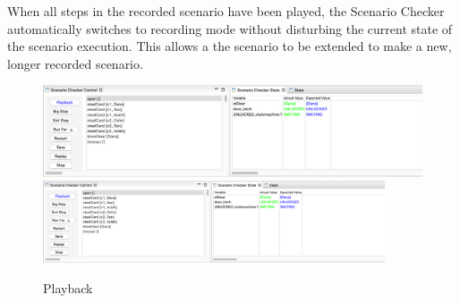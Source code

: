 When all steps in the recorded scenario have been played, the Scenario Checker automatically switches to recording mode without disturbing the current state of the scenario execution. This allows a the scenario to be extended to make a new, longer recorded scenario.

\begin{figure}[!htbp]
	\centering
	\ifplastex
	\includegraphics[width=512]{figures/playback}
	\else
	\includegraphics[width=0.9\textwidth]{figures/playback}
	\fi
	\caption{Playback}
	\label{fig:playback}
\end{figure}

